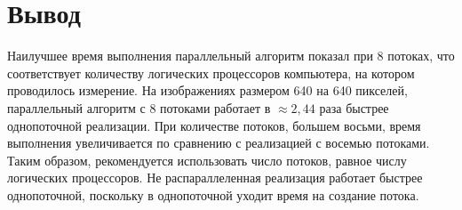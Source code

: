 \section{Вывод}

Наилучшее время выполнения параллельный алгоритм показал при 8 потоках, что соответствует количеству логических процессоров компьютера, на котором проводилось измерение. На изображениях размером 640 на 640 пикселей, параллельный алгоритм с 8 потоками работает в $\approx 2,44$ раза быстрее однопоточной реализации. При количестве потоков, большем восьми, время
выполнения увеличивается по сравнению с реализацией с восемью потоками. Таким образом, рекомендуется использовать число потоков, равное числу логических процессоров.
Не распараллеленная реализация работает быстрее однопоточной, поскольку в
однопоточной уходит время на создание потока.